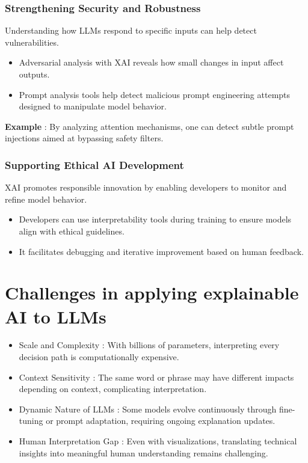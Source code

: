 \documentclass[conference]{IEEEtran}
\begin{document}
\subsubsection{Strengthening Security and Robustness}
Understanding how LLMs respond to specific inputs can help detect vulnerabilities.
\begin{itemize}
    \item Adversarial analysis with XAI reveals how small changes in input affect outputs.
    \item Prompt analysis tools help detect malicious prompt engineering attempts designed to manipulate model behavior.
\end{itemize}
\textbf{Example} : By analyzing attention mechanisms, one can detect subtle prompt injections aimed at bypassing safety filters.

\subsubsection{Supporting Ethical AI Development}
XAI promotes responsible innovation by enabling developers to monitor and refine model behavior.
\begin{itemize}
    \item Developers can use interpretability tools during training to ensure models align with ethical guidelines.
    \item It facilitates debugging and iterative improvement based on human feedback.    
\end{itemize}

\section{Challenges in applying explainable AI to LLMs}
\begin{itemize}
    \item Scale and Complexity : With billions of parameters, interpreting every decision path is computationally expensive.
    \item Context Sensitivity : The same word or phrase may have different impacts depending on context, complicating interpretation.
    \item Dynamic Nature of LLMs : Some models evolve continuously through fine-tuning or prompt adaptation, requiring ongoing explanation updates.
    \item Human Interpretation Gap : Even with visualizations, translating technical insights into meaningful human understanding remains challenging.
\end{itemize}
\end{document}
